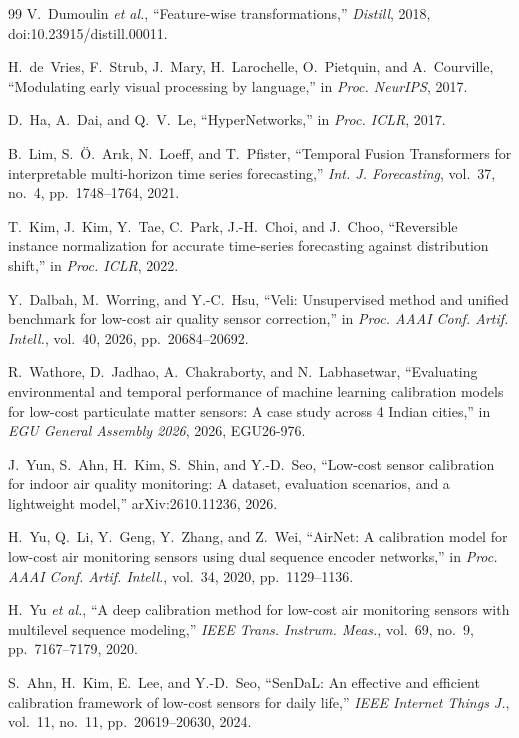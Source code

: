 \documentclass[journal]{IEEEtran}
\begin{document}
\begin{thebibliography}{99}
 V.~Dumoulin \emph{et al.}, ``Feature-wise transformations,'' \emph{Distill}, 2018,
doi:10.23915/distill.00011.

 H.~de~Vries, F.~Strub, J.~Mary, H.~Larochelle, O.~Pietquin, and A.~Courville, ``Modulating
early visual processing by language,'' in \emph{Proc. NeurIPS}, 2017.

 D.~Ha, A.~Dai, and Q.~V.~Le, ``HyperNetworks,'' in \emph{Proc. ICLR}, 2017.

 B.~Lim, S.~\"O.~Ar\i k, N.~Loeff, and T.~Pfister, ``Temporal Fusion Transformers for interpretable
multi-horizon time series forecasting,'' \emph{Int. J. Forecasting}, vol.~37, no.~4, pp.~1748--1764, 2021.

 T.~Kim, J.~Kim, Y.~Tae, C.~Park, J.-H.~Choi, and J.~Choo, ``Reversible instance normalization for
accurate time-series forecasting against distribution shift,'' in \emph{Proc. ICLR}, 2022.

 Y.~Dalbah, M.~Worring, and Y.-C.~Hsu, ``Veli: Unsupervised method and unified benchmark for low-cost
air quality sensor correction,'' in \emph{Proc. AAAI Conf. Artif. Intell.}, vol.~40, 2026, pp.~20684--20692.

 R.~Wathore, D.~Jadhao, A.~Chakraborty, and N.~Labhasetwar, ``Evaluating environmental and
temporal performance of machine learning calibration models for low-cost particulate matter sensors: A case study
across 4 Indian cities,'' in \emph{EGU General Assembly 2026}, 2026, EGU26-976.

 J.~Yun, S.~Ahn, H.~Kim, S.~Shin, and Y.-D.~Seo, ``Low-cost sensor calibration for indoor air quality
monitoring: A dataset, evaluation scenarios, and a lightweight model,'' arXiv:2610.11236, 2026.

 H.~Yu, Q.~Li, Y.~Geng, Y.~Zhang, and Z.~Wei, ``AirNet: A calibration model for low-cost air
monitoring sensors using dual sequence encoder networks,'' in \emph{Proc. AAAI Conf. Artif. Intell.}, vol.~34, 2020,
pp.~1129--1136.

 H.~Yu \emph{et al.}, ``A deep calibration method for low-cost air monitoring sensors with
multilevel sequence modeling,'' \emph{IEEE Trans. Instrum. Meas.}, vol.~69, no.~9, pp.~7167--7179, 2020.

 S.~Ahn, H.~Kim, E.~Lee, and Y.-D.~Seo, ``SenDaL: An effective and efficient calibration
framework of low-cost sensors for daily life,'' \emph{IEEE Internet Things J.}, vol.~11, no.~11, pp.~20619--20630,
2024.


\end{thebibliography}
\end{document}
